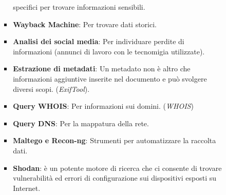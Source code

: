 \documentclass[12pt]{article}
\begin{document}
\begin{enumerate}
\begin{enumerate}
\begin{itemize}
\begin{itemize}
                specifici per trovare informazioni sensibili.
                \item \textbf{Wayback Machine}: Per trovare dati storici.
                \item \textbf{Analisi dei social media}: Per individuare perdite 
                di informazioni (annunci di lavoro con le tecnomigia utilizzate).
                \item \textbf{Estrazione di metadati}: Un metadato non \`{e} 
                altro che informazioni aggiuntive inserite nel documento e pu\`{o}
                svolgere diversi scopi. (\textit{ExifTool}).
                \item \textbf{Query WHOIS}: Per informazioni sui domini. (\textit{WHOIS})
                \item \textbf{Query DNS}: Per la mappatura della rete.
                \item \textbf{Maltego e Recon-ng}: Strumenti per automatizzare 
                la raccolta dati.
                \item \textbf{Shodan}: \`{e} un potente motore di ricerca che ci 
                consente di trovare vulnerabilit\`{a} ed errori di configurazione 
                sui dispositivi esposti su Internet.
            \end{itemize}
        \end{itemize}
        

\end{enumerate}
\end{enumerate}
\end{document}
